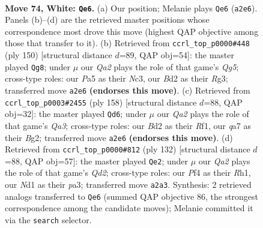 \documentclass[11pt]{article}
\begin{document}
\clearpage

\begin{figure}[p]\centering
\begin{subfigure}{0.46\textwidth}\centering
\resizebox{\linewidth}{!}{%
\newchessgame
\chessboard[
  setfen={r7/q3b1k1/5n2/P1p2p2/3p1Pp1/8/QR1BP3/3NK3 w - - 8 74},
  showmover=false,
  pgfstyle=straightmove, color=movearrow, markmove={a2-e6}
]}
\caption{}
\end{subfigure}\hfill
\begin{subfigure}{0.46\textwidth}\centering
\resizebox{\linewidth}{!}{%
\newchessgame
\chessboard[
  setfen={2n5/1kq2r2/1p2p3/p2pP1Q1/P6P/1PN3RK/8/8 w - - 13 76},
  showmover=false,
  pgfstyle=straightmove, color=movearrow, markmove={g5-g8}
]}
\caption{}
\end{subfigure}
\\[4pt]
\begin{subfigure}{0.46\textwidth}\centering
\resizebox{\linewidth}{!}{%
\newchessgame
\chessboard[
  setfen={6k1/1pr5/2p1nqp1/P2p4/6Pp/Q3P2P/5PB1/5RK1 w - - 0 80},
  showmover=false,
  pgfstyle=straightmove, color=movearrow, markmove={a3-d6}
]}
\caption{}
\end{subfigure}\hfill
\begin{subfigure}{0.46\textwidth}\centering
\resizebox{\linewidth}{!}{%
\newchessgame
\chessboard[
  setfen={6k1/2pq1n2/1p3b2/3P1Pp1/1Pr5/p4BB1/P2Q2K1/7R w - - 0 67},
  showmover=false,
  pgfstyle=straightmove, color=movearrow, markmove={d2-e2}
]}
\caption{}
\end{subfigure}
\caption{\textbf{Move 74, White: \texttt{Qe6}.} (a) Our position; Melanie plays \texttt{Qe6} (\texttt{a2e6}). Panels (b)--(d) are the retrieved master positions whose correspondence most drove this move (highest QAP objective among those that transfer to it). (b) Retrieved from \texttt{ccrl\_top\_p0000\#448} (ply 150) [structural distance $d$=89, QAP obj=54]: the master played \texttt{Qg8}; under $\mu$ our \emph{Qa2} plays the role of that game's \emph{Qg5}; cross-type roles: our \emph{P}a5 as their \emph{N}c3, our \emph{B}d2 as their \emph{R}g3; transferred move \texttt{a2e6} \textbf{(endorses this move)}. (c) Retrieved from \texttt{ccrl\_top\_p0003\#2455} (ply 158) [structural distance $d$=88, QAP obj=32]: the master played \texttt{Qd6}; under $\mu$ our \emph{Qa2} plays the role of that game's \emph{Qa3}; cross-type roles: our \emph{B}d2 as their \emph{R}f1, our \emph{q}a7 as their \emph{B}g2; transferred move \texttt{a2e6} \textbf{(endorses this move)}. (d) Retrieved from \texttt{ccrl\_top\_p0000\#812} (ply 132) [structural distance $d$=88, QAP obj=57]: the master played \texttt{Qe2}; under $\mu$ our \emph{Qa2} plays the role of that game's \emph{Qd2}; cross-type roles: our \emph{P}f4 as their \emph{R}h1, our \emph{N}d1 as their \emph{p}a3; transferred move \texttt{a2a3}. Synthesis: 2 retrieved analogs transferred to \texttt{Qe6} (summed QAP objective 86, the strongest correspondence among the candidate moves); Melanie committed it via the \texttt{search} selector.}
\label{fig:thought-m146}
\end{figure}
\end{document}
